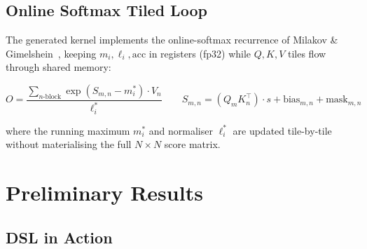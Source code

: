 \documentclass[12pt]{article}
\begin{document}
\subsection{Online Softmax Tiled Loop}

The generated kernel implements the online-softmax recurrence of Milakov \&
Gimelshein~\cite{milakov2018online}, keeping $m_i, \ell_i, \mathrm{acc}$ in
registers (fp32) while $Q, K, V$ tiles flow through shared memory:

\begin{equation}
  O = \frac{\sum_{n\text{-block}} \exp(S_{m,n} - m_i^*) \cdot V_n}
           {\ell_i^*}
  \qquad
  S_{m,n} = (Q_m K_n^\top) \cdot s + \text{bias}_{m,n} + \text{mask}_{m,n}
\end{equation}

where the running maximum $m_i^*$ and normaliser $\ell_i^*$ are updated
tile-by-tile without materialising the full $N \times N$ score matrix.

\section{Preliminary Results}

\subsection{DSL in Action}
\end{document}
